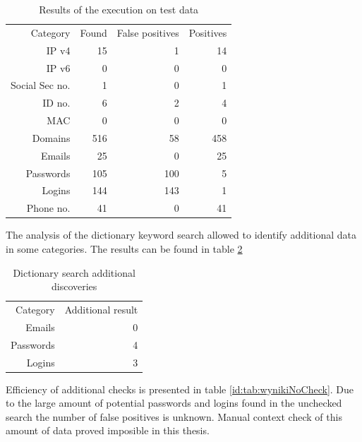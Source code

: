 \documentclass[a4paper,twoside,12pt]{book}
\begin{document}
\begin{table}
   \centering
   \caption{Results of the execution on test data}
   \label{id:tab:wyniki}
   \begin{tabular}{rrrr}
   \toprule
      Category       &   Found &   False positives & Positives \\
      IP v4          &      15 &                 1 &        14 \\
      IP v6          &       0 &                 0 &         0 \\
      Social Sec no. &       1 &                 0 &         1 \\
      ID no.         &       6 &                 2 &         4 \\
      MAC            &       0 &                 0 &         0 \\
      Domains        &     516 &                58 &       458 \\
      Emails         &      25 &                 0 &        25 \\
      Passwords      &     105 &               100 &         5 \\
      Logins         &     144 &               143 &         1 \\
      Phone no.      &      41 &                 0 &        41 \\
   \bottomrule
   \end{tabular}
   \end{table}  

The analysis of the dictionary keyword search allowed to identify additional data in some categories. The results can be found in table \ref{id:tab:wynikiDictionary}

\begin{table}
   \centering
   \caption{Dictionary search additional discoveries}
   \label{id:tab:wynikiDictionary}
   \begin{tabular}{rr}
   \toprule
      Category       &   Additional result \\
      Emails         &                   0 \\
      Passwords      &                   4 \\
      Logins         &                   3 \\
   \bottomrule
   \end{tabular}
   \end{table} 

Efficiency of additional checks is presented in table \ref{id:tab:wynikiNoCheck}. Due to the large amount of potential passwords and logins
found in the unchecked search the number of false positives is unknown. Manual context check of this amount of data proved imposible in this 
thesis.
\end{document}
